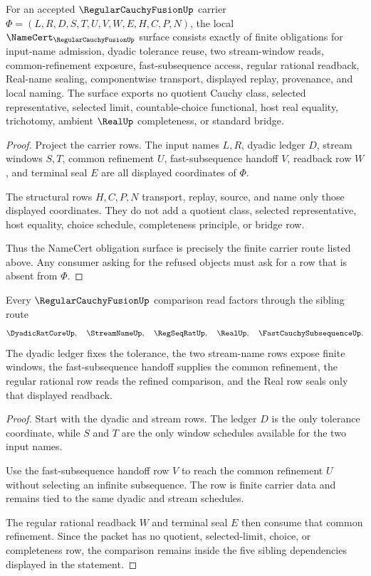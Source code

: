 \begin{theorem}
\label{thm:regular-cauchy-fusion-namecert-obligations}
For an accepted $\RegularCauchyFusionUp$ carrier $\Phi=(L,R,D,S,T,U,V,W,E,H,C,P,N)$, the local $\NameCert_{\RegularCauchyFusionUp}$ surface consists exactly of finite obligations for input-name admission, dyadic tolerance reuse, two stream-window reads, common-refinement exposure, fast-subsequence access, regular rational readback, Real-name sealing, componentwise transport, displayed replay, provenance, and local naming. The surface exports no quotient Cauchy class, selected representative, selected limit, countable-choice functional, host real equality, trichotomy, ambient $\RealUp$ completeness, or standard bridge.
\end{theorem}
\begin{proof}
Project the carrier rows. The input names $L,R$, dyadic ledger $D$, stream windows $S,T$, common refinement $U$, fast-subsequence handoff $V$, readback row $W$, and terminal seal $E$ are all displayed coordinates of $\Phi$.

The structural rows $H,C,P,N$ transport, replay, source, and name only those displayed coordinates. They do not add a quotient class, selected representative, host equality, choice schedule, completeness principle, or bridge row.

Thus the NameCert obligation surface is precisely the finite carrier route listed above. Any consumer asking for the refused objects must ask for a row that is absent from $\Phi$.
\end{proof}

\begin{theorem}
\label{thm:regular-cauchy-fusion-l10-sibling-dependency}
Every $\RegularCauchyFusionUp$ comparison read factors through the sibling route
$$
\DyadicRatCoreUp,\quad \StreamNameUp,\quad \RegSeqRatUp,\quad \RealUp,\quad \FastCauchySubsequenceUp .
$$
The dyadic ledger fixes the tolerance, the two stream-name rows expose finite windows, the fast-subsequence handoff supplies the common refinement, the regular rational row reads the refined comparison, and the Real row seals only that displayed readback.
\end{theorem}
\begin{proof}
Start with the dyadic and stream rows. The ledger $D$ is the only tolerance coordinate, while $S$ and $T$ are the only window schedules available for the two input names.

Use the fast-subsequence handoff row $V$ to reach the common refinement $U$ without selecting an infinite subsequence. The row is finite carrier data and remains tied to the same dyadic and stream schedules.

The regular rational readback $W$ and terminal seal $E$ then consume that common refinement. Since the packet has no quotient, selected-limit, choice, or completeness row, the comparison remains inside the five sibling dependencies displayed in the statement.
\end{proof}

